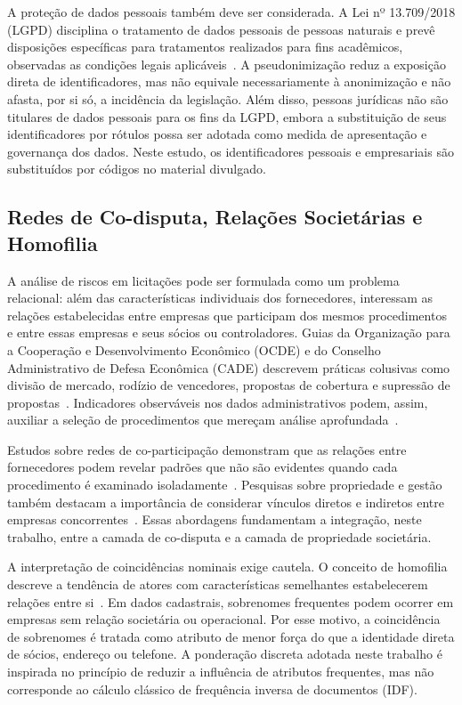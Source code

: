 A proteção de dados pessoais também deve ser considerada. A Lei nº 13.709/2018 (LGPD) disciplina o tratamento de dados pessoais de pessoas naturais e prevê disposições específicas para tratamentos realizados para fins acadêmicos, observadas as condições legais aplicáveis~\cite{brasil2018lgpd}. A pseudonimização reduz a exposição direta de identificadores, mas não equivale necessariamente à anonimização e não afasta, por si só, a incidência da legislação. Além disso, pessoas jurídicas não são titulares de dados pessoais para os fins da LGPD, embora a substituição de seus identificadores por rótulos possa ser adotada como medida de apresentação e governança dos dados. Neste estudo, os identificadores pessoais e empresariais são substituídos por códigos no material divulgado.

\subsection{Redes de Co-disputa, Relações Societárias e Homofilia}

A análise de riscos em licitações pode ser formulada como um problema relacional: além das características individuais dos fornecedores, interessam as relações estabelecidas entre empresas que participam dos mesmos procedimentos e entre essas empresas e seus sócios ou controladores. Guias da Organização para a Cooperação e Desenvolvimento Econômico (OCDE) e do Conselho Administrativo de Defesa Econômica (CADE) descrevem práticas colusivas como divisão de mercado, rodízio de vencedores, propostas de cobertura e supressão de propostas~\cite{oecd2025guidelines,cade2019guia}. Indicadores observáveis nos dados administrativos podem, assim, auxiliar a seleção de procedimentos que mereçam análise aprofundada~\cite{carbone2024bidrigging,fazekas2016objective,wachs2020corruption}.

Estudos sobre redes de co-participação demonstram que as relações entre fornecedores podem revelar padrões que não são evidentes quando cada procedimento é examinado isoladamente~\cite{wachs2019cartel,lyra2021characterization}. Pesquisas sobre propriedade e gestão também destacam a importância de considerar vínculos diretos e indiretos entre empresas concorrentes~\cite{villamil2024collusion,pompeu2025collusion}. Essas abordagens fundamentam a integração, neste trabalho, entre a camada de co-disputa e a camada de propriedade societária.

A interpretação de coincidências nominais exige cautela. O conceito de homofilia descreve a tendência de atores com características semelhantes estabelecerem relações entre si~\cite{mcpherson2001homophily}. Em dados cadastrais, sobrenomes frequentes podem ocorrer em empresas sem relação societária ou operacional. Por esse motivo, a coincidência de sobrenomes é tratada como atributo de menor força do que a identidade direta de sócios, endereço ou telefone. A ponderação discreta adotada neste trabalho é inspirada no princípio de reduzir a influência de atributos frequentes, mas não corresponde ao cálculo clássico de frequência inversa de documentos (IDF).

